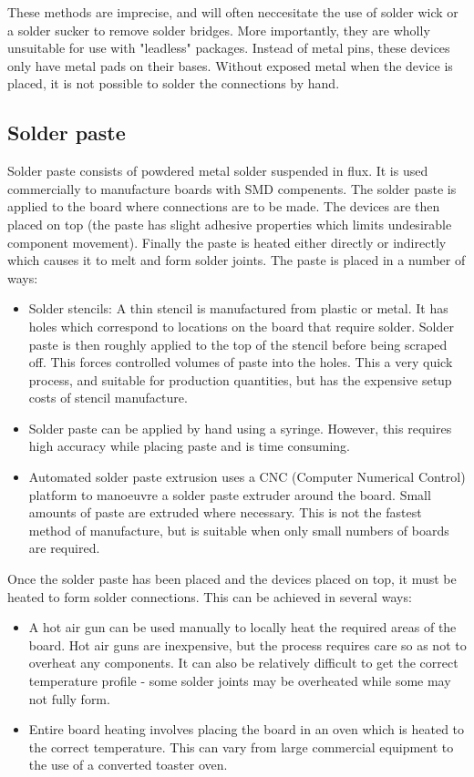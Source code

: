 \documentclass[a4paper,11pt]{article}  %
\begin{document}
These methods are imprecise, and will often neccesitate the use of solder wick or a solder sucker to remove solder bridges. More importantly, they are wholly unsuitable
for use with "leadless" packages. Instead of metal pins, these devices only have metal pads on their bases. Without exposed metal when the device is placed, it is not possible
to solder the connections by hand.

\subsection{Solder paste}

Solder paste consists of powdered metal solder suspended in flux. It is used commercially to manufacture boards with SMD compenents. The solder paste is applied to the board where
connections are to be made. The devices are then placed on top (the paste has slight adhesive properties which limits undesirable component movement). Finally the paste is heated either directly
or indirectly which causes it to melt and form solder joints. The paste is placed in a number of ways:

\begin{itemize}
			\item	Solder stencils: A thin stencil is manufactured from plastic or metal. It has holes which correspond to locations on the board that require solder.
					Solder paste is then roughly applied to the top of the stencil before being scraped off. This forces controlled volumes of paste into the holes.
					This a very quick process, and suitable for production quantities, but has the expensive setup costs of stencil manufacture.
			\item	Solder paste can be applied by hand using a syringe. However, this requires high accuracy while placing paste and is time consuming.
			\item	Automated solder paste extrusion uses a CNC (Computer Numerical Control) platform to manoeuvre a solder paste extruder around the board. Small amounts of paste
					are extruded where necessary. This is not the fastest method of manufacture, but is suitable when only small numbers of boards are required.
\end{itemize}

Once the solder paste has been placed and the devices placed on top, it must be heated to form solder connections. This can be achieved in several ways:

\begin{itemize}
			\item	A hot air gun can be used manually to locally heat the required areas of the board. Hot air guns are inexpensive, but the process requires care so as not to overheat any
					components. It can also be relatively difficult to get the correct temperature profile - some solder joints may be overheated while some may not fully form.
			\item	Entire board heating involves placing the board in an oven which is heated to the correct temperature. This can vary from large commercial equipment to the use of a
					converted toaster oven.
\end{itemize}
			
\end{document}
